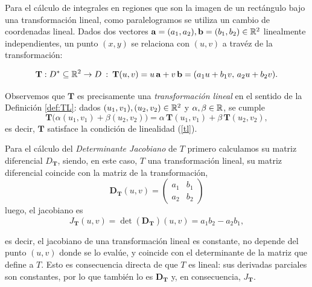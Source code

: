 Para el c\'alculo de integrales en regiones que son la imagen de un rect\'angulo bajo una transformaci\'on lineal, como paralelogramos se utiliza un cambio de coordenadas lineal. Dados dos vectores $\mathbf{a}=(a_1,a_2), \mathbf{b}=(b_1,b_2) \in \mathbb{R}^2$ linealmente independientes, un punto $(x,y)$ se relaciona con $(u,v)$ a trav\'ez de la transformaci\'on:

\begin{equation} \label{def:coord_lineales}
\mathbf{T}:D^*\subseteq\mathbb{R}^2 \to D\: : \: \mathbf{T}(u, v ) = u\,\mathbf{a} + v\,\mathbf{b} = (a_1 u + b_1 v,\, a_2 u + b_2 v).
\end{equation}

Observemos que $\mathbf{T}$ es precisamente una \emph{transformaci\'on lineal} en el sentido de la Definici\'on \ref{def:TL}: dados $(u_1,v_1),(u_2,v_2)\in\mathbb{R}^2$ y $\alpha,\beta\in\mathbb{R}$, se cumple
\begin{equation*}
\mathbf{T}\big(\alpha(u_1,v_1)+\beta(u_2,v_2)\big)=\alpha\,\mathbf{T}(u_1,v_1)+\beta\,\mathbf{T}(u_2,v_2),
\end{equation*}
es decir, $\mathbf{T}$ satisface la condici\'on de linealidad (\ref{tl}).

\vspace{0.2cm}

Para el c\'alculo del \emph{Determinante Jacobiano} de $T$ primero calculamos su matriz diferencial $D_\mathbf{T}$, siendo, en este caso, $T$ una transformaci\'on lineal, su matriz diferencial coincide con la matriz de la transformaci\'on,
       \begin{equation*}
       \boldsymbol{D}_{\mathbf{T}}(u, v)
       =
       \begin{pmatrix}
       a_1 & b_1 \\
       a_2 & b_2
       \end{pmatrix}
      \end{equation*}
   luego, el jacobiano es
       \begin{equation}\label{ejemplo_jacobiano_lineales}
       J_{\mathbf{T}}(u, v) = \det(\boldsymbol{D}_{\mathbf{T}})(u, v) = a_1 b_2 - a_2 b_1,
      \end{equation}

es decir, el jacobiano de una transformaci\'on lineal es constante, no depende del punto $(u,v)$ donde se lo eval\'ue, y coincide con el determinante de la matriz que define a $T$. Esto es consecuencia directa de que $T$ es lineal: sus derivadas parciales son constantes, por lo que tambi\'en lo es $\boldsymbol{D}_\mathbf{T}$ y, en consecuencia, $J_\mathbf{T}$.

